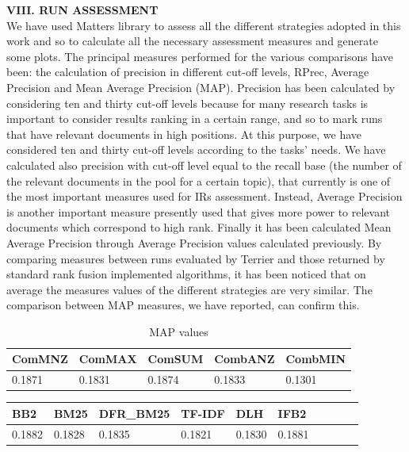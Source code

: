 \documentclass[12pt,journal]{IEEEtran}
\begin{document}
\textbf{VIII.	RUN ASSESSMENT} \\
We have used Matters library to assess all the different strategies adopted in this work and so to calculate all the necessary assessment measures and generate some plots.
The principal measures performed for the various comparisons have been: the calculation of precision in different cut-off levels, RPrec, Average Precision and Mean Average Precision (MAP).
Precision has been calculated by considering ten and thirty cut-off levels because for many research tasks is important to consider results ranking in a certain range, and so to mark runs that have relevant documents in high positions. At this purpose, we have considered ten and thirty cut-off levels according to the tasks' needs. We have calculated also precision with cut-off level equal to the recall base (the number of the relevant documents in the pool for a certain topic), that currently is one of the most important measures used for IRs assessment.
Instead, Average Precision is another important measure presently used that gives more power to relevant documents which correspond to high rank.
Finally it has been calculated Mean Average Precision through Average Precision values calculated previously.
By comparing measures between runs evaluated by Terrier and those returned by standard rank fusion implemented algorithms, it has been noticed that on average the measures values of the different strategies are very similar. The comparison between MAP measures, we have reported, can confirm this.

\begin{table}[h!]
\centering
\caption{MAP values}
\begin{tabular}{|l|l|l|l|l|}
\hline
ComMNZ & ComMAX & ComSUM & CombANZ & CombMIN \\ \hline
0.1871 & 0.1831 & 0.1874 & 0.1833 & 0.1301 \\ \hline
\end{tabular}
\end{table}

\begin{table}[h!]
\centering
\begin{tabular}{|l|l|l|l|l|l|l|l|l|l|}
\hline
BB2    & BM25   & DFR\_BM25 & TF-IDF & DLH & IFB2     \\ \hline
0.1882 & 0.1828 & 0.1835    & 0.1821 & 0.1830 & 0.1881 \\ \hline

\end{tabular}
\end{table}
\end{document}
